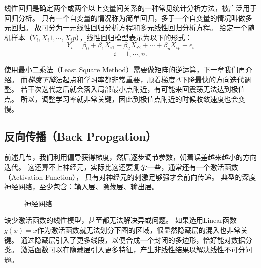 线性回归是确定两个或两个以上变量间关系的一种常见统计分析方法，被广泛用于回归分析。
只有一个自变量的情况称为简单回归，多于一个自变量的情况叫做多元回归。
故可分为一元线性回归分析方程和多元线性回归分析方程。
给定一个随机样本（$Y_i, X_i1, \cdots, X_ip$），线性回归模型表示为以下的形式：
$$Y_i = \beta_0+\beta_1X_{i1}+\beta_2X_{i2}+\cdots+\beta_pX_{ip}+\epsilon_i$$
$$i=1,\cdots,n.$$

使用最小二乘法（Least Square Method）需要做矩阵的逆运算，下一章我们再介绍。
而\emph{梯度下降}法起点和学习率都非常重要，顺着梯度$\Delta$下降最快的方向迭代调整。
若干次迭代之后就会落入局部最小点附近，有可能来回震荡无法达到极值点。
所以，调整学习率就非常关键，因此到极值点附近的时候收敛速度也会变慢。




\subsection{反向传播（Back Propgation）}
前述几节，我们利用偏导获得梯度，然后逐步调节参数，朝着误差越来越小的方向迭代。
这还算不上神经元，实际比这还要复杂一些，通常还有一个激活函数（Activation Function），
只有对神经元的刺激足够强才会前向传递。
典型的深度神经网络，至少包含：输入层、隐藏层、输出层。

\begin{figure}[!htb] \centering 
	\caption{神经网络}
	\label{fig:part2_math_neural_node}
\end{figure}

缺少激活函数的线性模型，甚至都无法解决异或问题。
如果选用Linear函数$g(x)=x$作为激活函数就无法划分下图的区域，很显然隐藏层的混入也非常关键。
通过隐藏层引入了更多线段，以便合成一个封闭的多边形，恰好能对数据分类。
激活函数可以在隐藏层引入更多特征，产生非线性结果以解决线性不可分问题。

